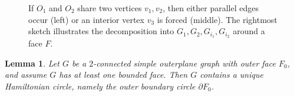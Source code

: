 \documentclass[12pt]{amsart}
\theoremstyle{theorem}%
\newtheorem{lemma}[theorem]{Lemma}
\theoremstyle{definition}%
\begin{document}
\begin{figure}[H]
\caption{If $O_1$ and $O_2$ share two vertices $v_1,v_2$, then either parallel edges occur (left) or an interior vertex $v_3$ is forced (middle). The rightmost sketch illustrates the decomposition into $G_1,G_2,G_{i_1},G_{i_2}$ around a face $F$.}
\label{figoo}
\end{figure}












\begin{lemma}\label{lem:weak-dual-tree-unique-ham}
Let $G$ be a $2$-connected simple outerplane graph with outer face $F_0$, and assume $G$ has at least one bounded face.
Then $G$ contains a unique Hamiltonian circle, namely the outer boundary circle $\partial F_0$.
\end{lemma}
\end{document}
